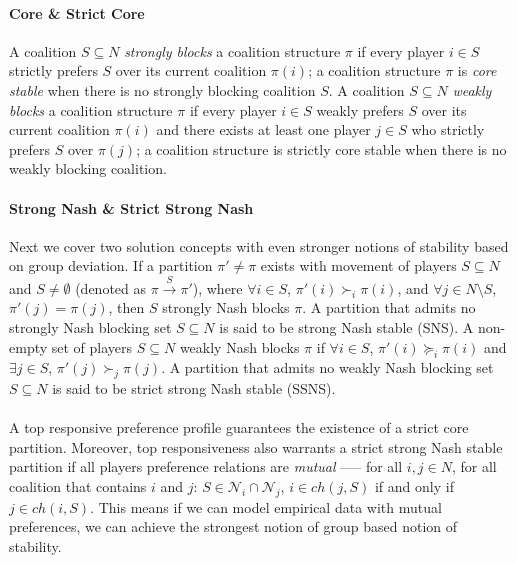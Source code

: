 \paragraph{Core \& Strict Core}
A coalition $S \subseteq N$ \textit{strongly blocks} a coalition structure $\pi$ if every player $i \in S$ strictly prefers $S$ over its current coalition $\pi(i)$; a coalition structure $\pi$ is \textit{core stable} when there is no strongly blocking coalition $S$. 
A coalition $S \subseteq N$ \textit{weakly blocks} a coalition structure $\pi$ if every player $i \in S$ weakly prefers $S$ over its current coalition $\pi(i)$ and there exists at least one player $j \in S$ who strictly prefers $S$ over $\pi(j)$; a coalition structure is strictly core stable when there is no weakly blocking coalition.

\paragraph{Strong Nash \& Strict Strong Nash}
Next we cover two solution concepts with even stronger notions of stability based on group deviation. 
If a partition $\pi' \neq \pi$ exists with movement of players $S \subseteq N$ and $S \neq \emptyset$ (denoted as $\pi \xrightarrow{S} \pi'$), where $\forall i \in S$, $\pi'(i) \succ_i \pi(i)$, and $\forall j \in N\text{\textbackslash}S$, $\pi'(j) = \pi(j)$, then $S$ strongly Nash blocks $\pi$. 
A partition that admits no strongly Nash blocking set $S \subseteq N$ is said to be strong Nash stable (SNS). A non-empty set of players $S \subseteq N$ weakly Nash blocks $\pi$ if $\forall i \in S$, $\pi'(i) \succeq_i \pi(i)$ and $\exists j \in S$, $\pi'(j) \succ_j \pi(j)$. 
A partition that admits no weakly Nash blocking set $S \subseteq N$ is said to be strict strong Nash stable (SSNS).

\paragraph{} 
A top responsive preference profile guarantees the existence of a strict core partition. Moreover, top responsiveness also warrants a strict strong Nash stable partition if all players preference relations are \textit{mutual} ––– for all $i, j \in N$, for all coalition that contains $i$ and $j$: $S \in \mathcal{N}_i \cap \mathcal{N}_j$, $i \in ch(j, S)$ if and only if $j \in ch(i, S)$. This means if we can model empirical data with mutual preferences, we can achieve the strongest notion of group based notion of stability.


